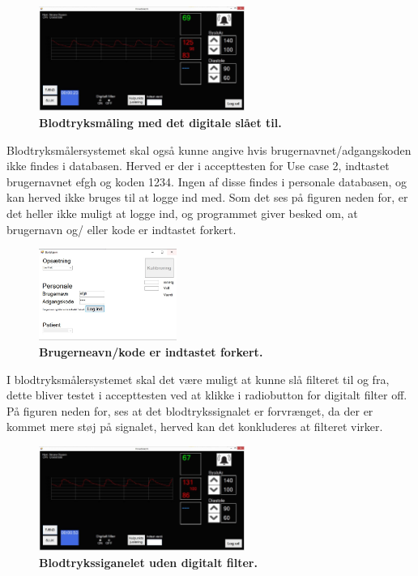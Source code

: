 \begin{figure}[H]
\includegraphics[width =0.6\textwidth , center]{billeder/IThovedGUIkorer}
\caption{\textbf{Blodtryksmåling med det digitale slået til.}}
\end{figure}
Blodtryksmålersystemet skal også kunne angive hvis brugernavnet/adgangskoden ikke findes i databasen. Herved er der i accepttesten for Use case 2, indtastet brugernavnet efgh og koden 1234. Ingen af disse findes i personale databasen, og kan herved ikke bruges til at logge ind med. Som det ses på figuren neden for, er det heller ikke muligt at logge ind, og programmet giver besked om, at brugernavn og/ eller kode er indtastet forkert.
\begin{figure}[H]
\includegraphics[width =0.4\textwidth , center]{billeder/ITstartGUIforkert}
\caption{\textbf{Brugerneavn/kode er indtastet forkert.}}
\end{figure}
I blodtryksmålersystemet skal det være muligt at kunne slå filteret til og fra, dette bliver testet i accepttesten ved at klikke i radiobutton for digitalt filter off. På figuren neden for, ses at det blodtrykssignalet er forvrænget, da der er kommet mere støj på signalet, herved kan det konkluderes at filteret virker. 
\begin{figure}[H]
\includegraphics[width =0.6\textwidth , center]{billeder/IThovedGUIkorerufiltreret}
\caption{\textbf{Blodtrykssiganelet uden digitalt filter.}}
\end{figure}
